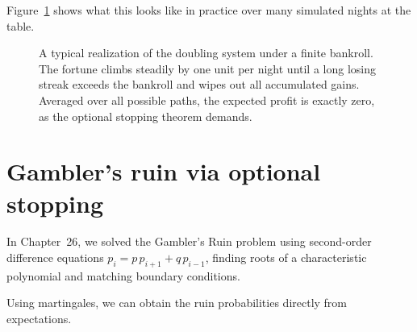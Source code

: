 Figure~\ref{ch28:fig-doubling} shows what this looks like in practice over many simulated nights at
the table.

\begin{figure}[H]
\centering
{}
\caption{A typical realization of the doubling system under a finite bankroll. The fortune climbs
steadily by one unit per night until a long losing streak exceeds the
bankroll and wipes out all accumulated gains. Averaged over all possible paths, the
expected profit is exactly zero, as the optional stopping theorem demands.}
\label{ch28:fig-doubling}
\end{figure}

\section{Gambler's ruin via optional stopping}
\label{ch28:gamblers-ruin}

In Chapter~26, we solved
the Gambler's Ruin problem using second-order difference equations $p_i = p\,p_{i+1} + q\,p_{i-1}$,
finding roots of a characteristic polynomial and matching boundary conditions.

Using martingales, we can obtain the ruin probabilities directly from expectations.

